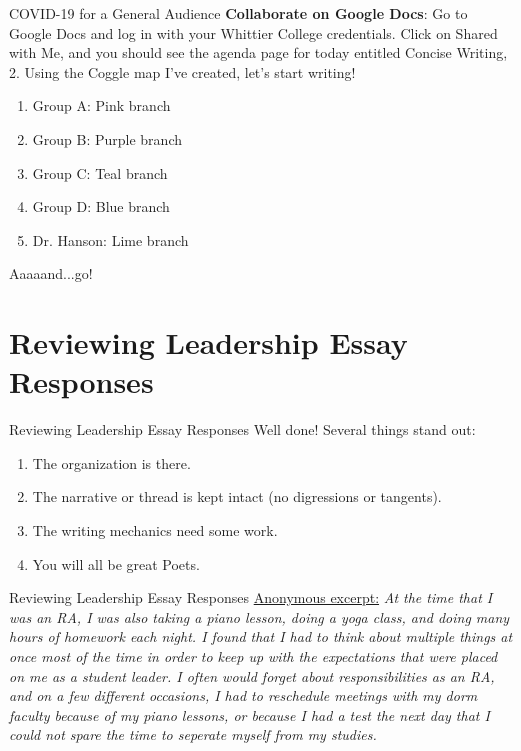 \documentclass{beamer}
\begin{document}
\begin{frame}{COVID-19 for a General Audience}
\textbf{Collaborate on Google Docs}: Go to Google Docs and log in with your Whittier College credentials.  Click on Shared with Me, and you should see the agenda page for today entitled Concise Writing, 2.  Using the Coggle map I've created, let's start writing!
\begin{enumerate}
\item Group A: Pink branch
\item Group B: Purple branch
\item Group C: Teal branch
\item Group D: Blue branch
\item Dr. Hanson: Lime branch
\end{enumerate}
Aaaaand...go!
\end{frame}

\section{Reviewing Leadership Essay Responses}

\begin{frame}{Reviewing Leadership Essay Responses}
\alert{Well done!} Several things stand out:
\begin{enumerate}
\item The organization is there.
\item The narrative or thread is kept intact (no digressions or tangents).
\item The writing mechanics need some work.
\item You will all be great Poets.
\end{enumerate}
\end{frame}

\begin{frame}{Reviewing Leadership Essay Responses}
\underline{Anonymous excerpt:}
\textit{At the time that I was an RA, I was also taking a piano lesson, doing a yoga class, and doing many hours of homework each night. I found that I had to think about multiple things at once most of the time in order to keep up with the expectations that were placed on me as a student leader. I often would forget about responsibilities as an RA, and on a few different occasions, I had to reschedule meetings with my dorm faculty because of my piano lessons, or because I had a test the next day that I could not spare the time to seperate myself from my studies.}
\end{frame}
\end{document}
